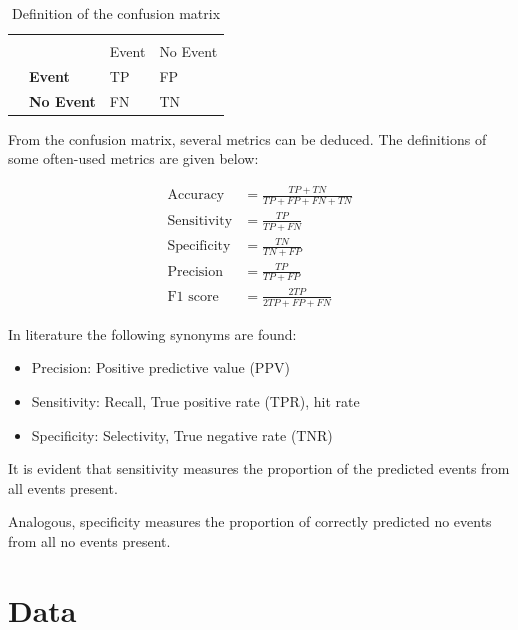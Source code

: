 \documentclass[
  11pt,
  a4paper,
  DIV=12,captions=tableheading,oneside]{scrbook}
\providecommand{\tightlist}{%
  \setlength{\itemsep}{0pt}\setlength{\parskip}{0pt}}
\providecommand{\tightlist}{%
  \setlength{\itemsep}{0pt}\setlength{\parskip}{0pt}}
\begin{document}
\begin{table}[!h]

\caption{\label{tab:conf-matrix-def}Definition of the confusion matrix}
\centering
\begin{tabular}{>{\bfseries}l>{\bfseries}lll}
\toprule
\multicolumn{2}{c}{ } & \multicolumn{2}{c}{True value} \\
\cmidrule(l{3pt}r{3pt}){3-4}
  &   & Event & No Event\\
\midrule
 & Event & TP & FP\\
\cmidrule{2-4}
\multirow{-2}{*}{\raggedright\arraybackslash Predicted} & No Event & FN & TN\\
\bottomrule
\end{tabular}
\end{table}

From the confusion matrix, several metrics can be deduced. The definitions of some often-used metrics are given below:

\begin{align*}
\text{Accuracy} &= \frac{TP + TN}{TP + FP + FN + TN} \\
\text{Sensitivity} &= \frac{TP}{TP + FN} \\
\text{Specificity} &= \frac{TN}{TN + FP} \\
\text{Precision} &= \frac{TP}{TP + FP} \\
\text{F1 score} &= \frac{2TP}{2TP+FP+FN}
\end{align*}

In literature the following synonyms are found:

\begin{itemize}
\tightlist
\item
  Precision: Positive predictive value (PPV)
\item
  Sensitivity: Recall, True positive rate (TPR), hit rate
\item
  Specificity: Selectivity, True negative rate (TNR)
\end{itemize}

It is evident that sensitivity measures the proportion of the predicted events from all events present.

Analogous, specificity measures the proportion of correctly predicted no events from all no events present.

\hypertarget{data}{%
\chapter{Data}\label{data}}
\end{document}

